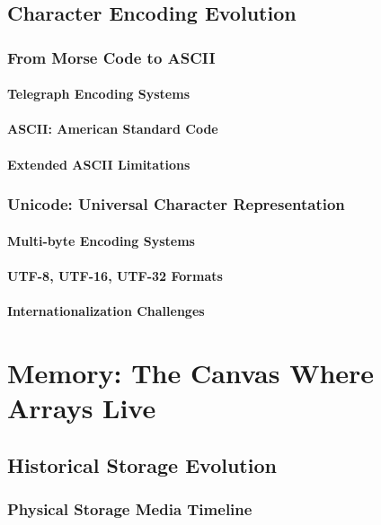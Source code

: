 \documentclass[12pt, oneside, openany]{book}
\begin{document}
\section{Character Encoding Evolution}
\subsection{From Morse Code to ASCII}
\subsubsection{Telegraph Encoding Systems}
\subsubsection{ASCII: American Standard Code}
\subsubsection{Extended ASCII Limitations}

\subsection{Unicode: Universal Character Representation}
\subsubsection{Multi-byte Encoding Systems}
\subsubsection{UTF-8, UTF-16, UTF-32 Formats}
\subsubsection{Internationalization Challenges}


\chapter{Memory: The Canvas Where Arrays Live}

\section{Historical Storage Evolution}
\subsection{Physical Storage Media Timeline}
\end{document}

